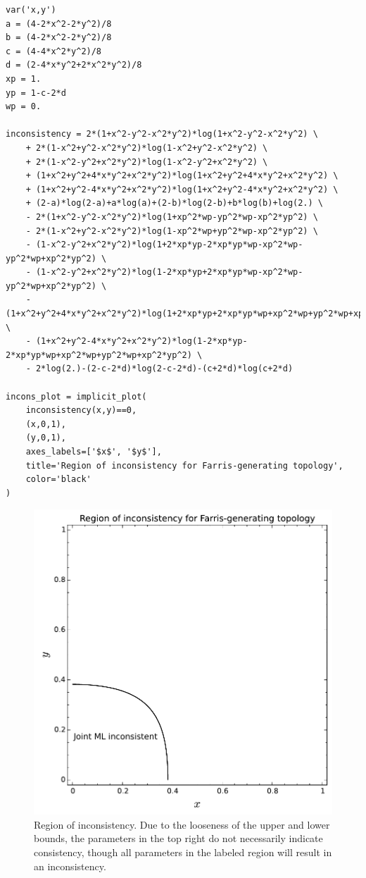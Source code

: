 \documentclass[a4paper]{article}
\begin{document}
\begin{table}
    \begin{center}
\begin{verbatim}
var('x,y')
a = (4-2*x^2-2*y^2)/8
b = (4-2*x^2-2*y^2)/8
c = (4-4*x^2*y^2)/8
d = (2-4*x*y^2+2*x^2*y^2)/8
xp = 1.
yp = 1-c-2*d
wp = 0.

inconsistency = 2*(1+x^2-y^2-x^2*y^2)*log(1+x^2-y^2-x^2*y^2) \
    + 2*(1-x^2+y^2-x^2*y^2)*log(1-x^2+y^2-x^2*y^2) \
    + 2*(1-x^2-y^2+x^2*y^2)*log(1-x^2-y^2+x^2*y^2) \
    + (1+x^2+y^2+4*x*y^2+x^2*y^2)*log(1+x^2+y^2+4*x*y^2+x^2*y^2) \
    + (1+x^2+y^2-4*x*y^2+x^2*y^2)*log(1+x^2+y^2-4*x*y^2+x^2*y^2) \
    + (2-a)*log(2-a)+a*log(a)+(2-b)*log(2-b)+b*log(b)+log(2.) \
    - 2*(1+x^2-y^2-x^2*y^2)*log(1+xp^2*wp-yp^2*wp-xp^2*yp^2) \
    - 2*(1-x^2+y^2-x^2*y^2)*log(1-xp^2*wp+yp^2*wp-xp^2*yp^2) \
    - (1-x^2-y^2+x^2*y^2)*log(1+2*xp*yp-2*xp*yp*wp-xp^2*wp-yp^2*wp+xp^2*yp^2) \
    - (1-x^2-y^2+x^2*y^2)*log(1-2*xp*yp+2*xp*yp*wp-xp^2*wp-yp^2*wp+xp^2*yp^2) \
    - (1+x^2+y^2+4*x*y^2+x^2*y^2)*log(1+2*xp*yp+2*xp*yp*wp+xp^2*wp+yp^2*wp+xp^2*yp^2) \
    - (1+x^2+y^2-4*x*y^2+x^2*y^2)*log(1-2*xp*yp-2*xp*yp*wp+xp^2*wp+yp^2*wp+xp^2*yp^2) \
    - 2*log(2.)-(2-c-2*d)*log(2-c-2*d)-(c+2*d)*log(c+2*d)

incons_plot = implicit_plot(
    inconsistency(x,y)==0,
    (x,0,1),
    (y,0,1),
    axes_labels=['$x$', '$y$'],
    title='Region of inconsistency for Farris-generating topology',
    color='black'
)
\end{verbatim}
    \end{center}
\caption{Sage code to generate Fig.~\ref{fig:inconsistency-farris}}
\label{list:sage}
\end{table}

\begin{figure}
\centering
\includegraphics[width=.9\textwidth]{analytic-inconsistency}
\caption{
    Region of inconsistency.
    Due to the looseness of the upper and lower bounds, the parameters in the top right do not necessarily indicate consistency, though all parameters in the labeled region will result in an inconsistency.
}
\label{fig:inconsistency-farris}
\end{figure}
\end{document}
